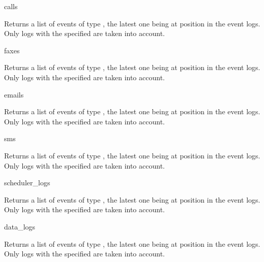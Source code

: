\begin{funcdesc}{calls}{}

Returns a list of  events of type , the latest one being at position
 in the event logs.
Only logs with the specified  are taken into account.

\end{funcdesc}

\begin{funcdesc}{faxes}{}

Returns a list of  events of type , the latest one being at position
 in the event logs.
Only logs with the specified  are taken into account.

\end{funcdesc}

\begin{funcdesc}{emails}{}

Returns a list of  events of type , the latest one being at position
 in the event logs.
Only logs with the specified  are taken into account.

\end{funcdesc}

\begin{funcdesc}{sms}{}

Returns a list of  events of type , the latest one being at position
 in the event logs.
Only logs with the specified  are taken into account.

\end{funcdesc}

\begin{funcdesc}{scheduler_logs}{}

Returns a list of  events of type , the latest one being at position
 in the event logs.
Only logs with the specified  are taken into account.

\end{funcdesc}

\begin{funcdesc}{data_logs}{}

Returns a list of  events of type , the latest one being at position
 in the event logs.
Only logs with the specified  are taken into account.

\end{funcdesc}
